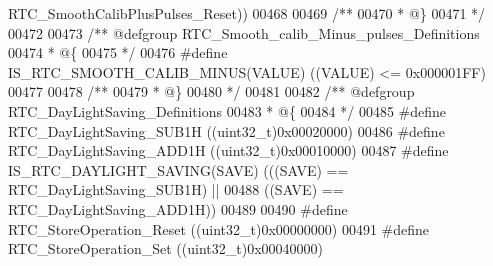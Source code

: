 \begin{DoxyCode}
      RTC_SmoothCalibPlusPulses_Reset\textcolor{preprocessor}{)}\textcolor{preprocessor}{)}
00468 
00469 \textcolor{comment}{/**}
00470 \textcolor{comment}{  * @\}}
00471 \textcolor{comment}{  */}
00472 
00473 \textcolor{comment}{/** @defgroup RTC\_Smooth\_calib\_Minus\_pulses\_Definitions }
00474 \textcolor{comment}{  * @\{}
00475 \textcolor{comment}{  */}
00476 \textcolor{preprocessor}{#}\textcolor{preprocessor}{define}  \textcolor{preprocessor}{IS\_RTC\_SMOOTH\_CALIB\_MINUS}\textcolor{preprocessor}{(}\textcolor{preprocessor}{VALUE}\textcolor{preprocessor}{)} \textcolor{preprocessor}{(}\textcolor{preprocessor}{(}\textcolor{preprocessor}{VALUE}\textcolor{preprocessor}{)} \textcolor{preprocessor}{<=} 0x000001FF\textcolor{preprocessor}{)}
00477 
00478 \textcolor{comment}{/**}
00479 \textcolor{comment}{  * @\}}
00480 \textcolor{comment}{  */}
00481 
00482 \textcolor{comment}{/** @defgroup RTC\_DayLightSaving\_Definitions }
00483 \textcolor{comment}{  * @\{}
00484 \textcolor{comment}{  */}
00485 \textcolor{preprocessor}{#}\textcolor{preprocessor}{define} \textcolor{preprocessor}{RTC\_DayLightSaving\_SUB1H}   \textcolor{preprocessor}{(}\textcolor{preprocessor}{(}\textcolor{preprocessor}{uint32\_t}\textcolor{preprocessor}{)}0x00020000\textcolor{preprocessor}{)}
00486 \textcolor{preprocessor}{#}\textcolor{preprocessor}{define} \textcolor{preprocessor}{RTC\_DayLightSaving\_ADD1H}   \textcolor{preprocessor}{(}\textcolor{preprocessor}{(}\textcolor{preprocessor}{uint32\_t}\textcolor{preprocessor}{)}0x00010000\textcolor{preprocessor}{)}
00487 \textcolor{preprocessor}{#}\textcolor{preprocessor}{define} \textcolor{preprocessor}{IS\_RTC\_DAYLIGHT\_SAVING}\textcolor{preprocessor}{(}\textcolor{preprocessor}{SAVE}\textcolor{preprocessor}{)} \textcolor{preprocessor}{(}\textcolor{preprocessor}{(}\textcolor{preprocessor}{(}\textcolor{preprocessor}{SAVE}\textcolor{preprocessor}{)} \textcolor{preprocessor}{==} RTC_DayLightSaving_SUB1H\textcolor{preprocessor}{)} \textcolor{preprocessor}{||}
00488                                       \textcolor{preprocessor}{(}\textcolor{preprocessor}{(}\textcolor{preprocessor}{SAVE}\textcolor{preprocessor}{)} \textcolor{preprocessor}{==} RTC_DayLightSaving_ADD1H\textcolor{preprocessor}{)}\textcolor{preprocessor}{)}
00489 
00490 \textcolor{preprocessor}{#}\textcolor{preprocessor}{define} \textcolor{preprocessor}{RTC\_StoreOperation\_Reset}        \textcolor{preprocessor}{(}\textcolor{preprocessor}{(}\textcolor{preprocessor}{uint32\_t}\textcolor{preprocessor}{)}0x00000000\textcolor{preprocessor}{)}
00491 \textcolor{preprocessor}{#}\textcolor{preprocessor}{define} \textcolor{preprocessor}{RTC\_StoreOperation\_Set}          \textcolor{preprocessor}{(}\textcolor{preprocessor}{(}\textcolor{preprocessor}{uint32\_t}\textcolor{preprocessor}{)}0x00040000\textcolor{preprocessor}{)}

\end{DoxyCode}
